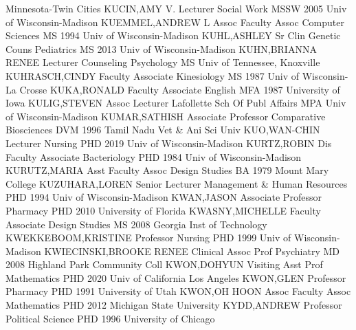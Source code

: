 \documentclass[
]{article}
\begin{document}
Minnesota-Twin Cities \textbar{}  \textbar KUCIN,AMY V.
\textbar Lecturer \textbar Social Work \textbar MSSW 2005 Univ of
Wisconsin-Madison \textbar{}  \textbar KUEMMEL,ANDREW L
\textbar Assoc Faculty Assoc \textbar Computer Sciences \textbar MS 1994
Univ of Wisconsin-Madison \textbar{}  \textbar KUHL,ASHLEY
\textbar Sr Clin Genetic Couns \textbar Pediatrics \textbar MS 2013 Univ
of Wisconsin-Madison \textbar{}  \textbar KUHN,BRIANNA RENEE
\textbar Lecturer \textbar Counseling Psychology \textbar MS Univ of
Tennessee, Knoxville \textbar{}  \textbar KUHRASCH,CINDY
\textbar Faculty Associate \textbar Kinesiology \textbar MS 1987 Univ of
Wisconsin-La Crosse \textbar{}  \textbar KUKA,RONALD
\textbar Faculty Associate \textbar English \textbar MFA 1987 University
of Iowa \textbar{}  \textbar KULIG,STEVEN \textbar Assoc
Lecturer \textbar Lafollette Sch Of Publ Affairs \textbar MPA Univ of
Wisconsin-Madison \textbar{}  \textbar KUMAR,SATHISH
\textbar Associate Professor \textbar Comparative Biosciences
\textbar DVM 1996 Tamil Nadu Vet \& Ani Sci Univ \textbar{} 
\textbar KUO,WAN-CHIN \textbar Lecturer \textbar Nursing \textbar PHD
2019 Univ of Wisconsin-Madison \textbar{} 
\textbar KURTZ,ROBIN \textbar Dis Faculty Associate
\textbar Bacteriology \textbar PHD 1984 Univ of Wisconsin-Madison
\textbar{}  \textbar KURUTZ,MARIA \textbar Asst Faculty
Assoc \textbar Design Studies \textbar BA 1979 Mount Mary College
\textbar{}  \textbar KUZUHARA,LOREN \textbar Senior Lecturer
\textbar Management \& Human Resources \textbar PHD 1994 Univ of
Wisconsin-Madison \textbar{}  \textbar KWAN,JASON
\textbar Associate Professor \textbar Pharmacy \textbar PHD 2010
University of Florida \textbar{}  \textbar KWASNY,MICHELLE
\textbar Faculty Associate \textbar Design Studies \textbar MS 2008
Georgia Inst of Technology \textbar{} 
\textbar KWEKKEBOOM,KRISTINE \textbar Professor \textbar Nursing
\textbar PHD 1999 Univ of Wisconsin-Madison \textbar{} 
\textbar KWIECINSKI,BROOKE RENEE \textbar Clinical Assoc Prof
\textbar Psychiatry \textbar MD 2008 Highland Park Community Coll
\textbar{}  \textbar KWON,DOHYUN \textbar Visiting Asst Prof
\textbar Mathematics \textbar PHD 2020 Univ of California Los Angeles
\textbar{}  \textbar KWON,GLEN \textbar Professor
\textbar Pharmacy \textbar PHD 1991 University of Utah \textbar{}
 \textbar KWON,OH HOON \textbar Assoc Faculty Assoc
\textbar Mathematics \textbar PHD 2012 Michigan State University
\textbar{}  \textbar KYDD,ANDREW \textbar Professor
\textbar Political Science \textbar PHD 1996 University of Chicago
\textbar{}  \textbar{}
\end{document}
